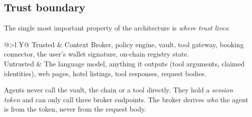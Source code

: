 \documentclass[11pt,a4paper]{article}
\begin{document}
\subsection{Trust boundary}
The single most important property of the architecture is \emph{where trust lives}:

\begin{center}
\renewcommand{\arraystretch}{1.3}
\begin{tabularx}{\textwidth}{@{}>{\bfseries}l Y@{}}
\toprule
Trusted & Context Broker, policy engine, vault, tool gateway, booking connector, the user's wallet signature, on-chain registry state.\\
Untrusted & The language model, anything it outputs (tool arguments, claimed identities), web pages, hotel listings, tool responses, request bodies.\\
\bottomrule
\end{tabularx}
\end{center}

Agents never call the vault, the chain or a tool directly. They hold a \emph{session token} and can only call three broker endpoints. The broker derives \emph{who} the agent is from the token, never from the request body.
\end{document}
